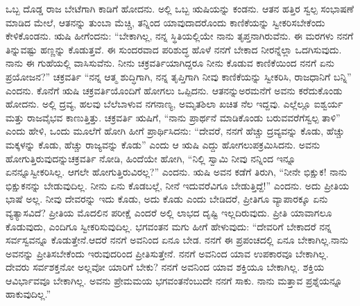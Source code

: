 ಒಬ್ಬ ದೊಡ್ಡ ರಾಜ ಬೇಟೆಗಾಗಿ ಕಾಡಿಗೆ ಹೋದನು. ಅಲ್ಲಿ ಒಬ್ಬ ಋಷಿಯನ್ನು ಕಂಡನು. ಆತನ ಹತ್ತಿರ ಸ್ವಲ್ಪ ಸಂಭಾಷಣೆ ಮಾಡಿದ ಮೇಲೆ, ಆತನನ್ನು ತುಂಬಾ ಮೆಚ್ಚಿ, ತನ್ನಿಂದ ಯಾವುದಾದರೊಂದು ಕಾಣಿಕೆಯನ್ನು ಸ್ವೀಕರಿಸಬೇಕೆಂದು ಕೇಳಿಕೊಂಡನು. ಋಷಿ ಹೀಗೆಂದನು: “ಬೇಕಾಗಿಲ್ಲ, ನನ್ನ ಸ್ಥಿತಿಯಲ್ಲಿಯೇ ನಾನು ತೃಪ್ತನಾಗಿರುವೆನು. ಈ ಮರಗಳು ನನಗೆ ತಿನ್ನುವಷ್ಟು ಹಣ್ಣನ್ನು ಕೊಡುತ್ತವೆ. ಈ ಸುಂದರವಾದ ಪರಿಶುದ್ಧ ಹೊಳೆ ನನಗೆ ಬೇಕಾದ ನೀರನ್ನೆಲ್ಲಾ ಒದಗಿಸುವುದು. ನಾನು ಈ ಗುಹೆಯಲ್ಲಿ ವಾಸಿಸುವೆನು. ನೀನು ಚಕ್ರವರ್ತಿಯಾಗಿದ್ದರೂ ನೀನು ಕೊಡುವ ಕಾಣಿಕೆಯಿಂದ ನನಗೆ ಏನು ಪ್ರಯೋಜನ?” ಚಕ್ರವರ್ತಿ “ನನ್ನ ಆತ್ಮ ಶುದ್ಧಿಗಾಗಿ, ನನ್ನ ತೃಪ್ತಿಗಾಗಿ ನೀವು ಕಾಣಿಕೆಯನ್ನು ಸ್ವೀಕರಿಸಿ, ರಾಜಧಾನಿಗೆ ಬನ್ನಿ” ಎಂದನು. ಕೊನೆಗೆ ಋಷಿ ಚಕ್ರವರ್ತಿಯೊಂದಿಗೆ ಹೋಗಲು ಒಪ್ಪಿದನು. ಆತನನ್ನು\break ಅರಮನೆಗೆ ಅವನು ಕರೆದುಕೊಂಡು ಹೋದನು. ಅಲ್ಲಿ ದ್ರವ್ಯ, ಹಲವು ಬೆಲೆಬಾಳುವ ನಗನಾಣ್ಯ, ಅಮೃತಶಿಲಾ ಖಚಿತ ನೆಲ ಇದ್ದವು. ಎಲ್ಲೆಲ್ಲೂ ಐಶ್ವರ್ಯ ಮತ್ತು ರಾಜವೈಭವ ಕಾಣುತ್ತಿತ್ತು. ಚಕ್ರವರ್ತಿ ಋಷಿಗೆ, “ನಾನು ಪ್ರಾರ್ಥನೆ ಮಾಡಿಕೊಂಡು ಬರುವವರೆಗೆ\break ಸ್ವಲ್ಪ ತಾಳಿ” ಎಂದು ಹೇಳಿ, ಒಂದು ಮೂಲೆಗೆ ಹೋಗಿ ಹೀಗೆ ಪ್ರಾರ್ಥಿಸಿದನು: “ದೇವರೆ, ನನಗೆ ಹೆಚ್ಚು ದ್ರವ್ಯವನ್ನು ಕೊಡು, ಹೆಚ್ಚು ಮಕ್ಕಳನ್ನು ಕೊಡು, ಹೆಚ್ಚು ರಾಜ್ಯವನ್ನು ಕೊಡು” ಎಂದು ಆ ಋಷಿ ಎದ್ದು ಹೋಗಲುಪಕ್ರಮಿಸಿದನು. ಅವನು ಹೋಗುತ್ತಿರುವುದನ್ನು\break ಚಕ್ರವರ್ತಿ ನೋಡಿ, ಹಿಂದೆಯೇ ಹೋಗಿ, “ನಿಲ್ಲಿ ಸ್ವಾಮಿ ನೀವು ನನ್ನಿಂದ ಇನ್ನೂ ಏನನ್ನೂ\break ಸ್ವೀಕರಿಸಿಲ್ಲ. ಆಗಲೇ ಹೋಗುತ್ತಿರುವಿರಲ್ಲ?” ಎಂದನು. ಋಷಿ ಅವನ ಕಡೆಗೆ ತಿರುಗಿ, “ನೀನೇ ಭಿಕ್ಷುಕ! ನಾನು ಭಿಕ್ಷುಕನನ್ನು ಬೇಡುವುದಿಲ್ಲ. ನೀನು ಏನು ಕೊಡಬಲ್ಲೆ, ನೀನೆ ಇದುವರೆವಿಗೂ ಬೇಡುತ್ತಿದ್ದೆ!” ಎಂದನು. ಅದು ಪ್ರೀತಿಯ ಭಾಷೆ ಅಲ್ಲ. ನೀವು ದೇವರನ್ನು ಇದು ಕೊಡು, ಅದು ಕೊಡು ಎಂದು ಬೇಡಿದರೆ, ಪ್ರೀತಿಗೂ ವ್ಯಾಪಾರಕ್ಕೂ ಏನು ವ್ಯತ್ಯಾಸವಿದೆ? ಪ್ರೀತಿಯ ಮೊದಲಿನ ಪರೀಕ್ಷೆ ಎಂದರೆ ಅಲ್ಲಿ ಲಾಭದ ದೃಷ್ಟಿ ಇಲ್ಲದಿರುವುದು. ಪ್ರೀತಿ ಯಾವಾಗಲೂ ಕೊಡುವುದು, ಎಂದಿಗೂ ಸ್ವೀಕರಿಸುವುದಿಲ್ಲ. ಭಗವಂತನ ಮಗು ಹೀಗೆ ಹೇಳುವುದು: “ದೇವರಿಗೆ ಬೇಕಾದರೆ ನನ್ನ ಸರ್ವಸ್ವವನ್ನೂ ಕೊಡುತ್ತೇನೆ.\break ಆದರೆ ನನಗೆ ಅವನಿಂದ ಏನೂ ಬೇಡ. ನನಗೆ ಈ ಪ್ರಪಂಚದಲ್ಲಿ ಏನೂ ಬೇಕಾಗಿಲ್ಲ.\break ನಾನು ಅವನನ್ನು ಪ್ರೀತಿಸಬೇಕೆಂದು ಇರುವುದರಿಂದ ಪ್ರೀತಿಸುತ್ತೇನೆ. ನನಗೆ ಅವನಿಂದ ಯಾವ ಉಪಕಾರವೂ ಬೇಕಾಗಿಲ್ಲ. ದೇವರು ಸರ್ವಶಕ್ತನೋ ಅಲ್ಲವೋ ಯಾರಿಗೆ ಬೇಕು? ನನಗೆ ಅವನಿಂದ ಯಾವ ಶಕ್ತಿಯೂ ಬೇಕಾಗಿಲ್ಲ. ಶಕ್ತಿಯ ಆವಿರ್ಭಾವವೂ ಬೇಕಾಗಿಲ್ಲ. ಅವನು ಪ್ರೇಮಮಯ ಭಗವಂತನೆಂಬುದೇ ನನಗೆ ಸಾಕು. ನಾನು ಮತ್ತಾವ ಪ್ರಶ್ನೆಯನ್ನೂ ಹಾಕುವುದಿಲ್ಲ.”


